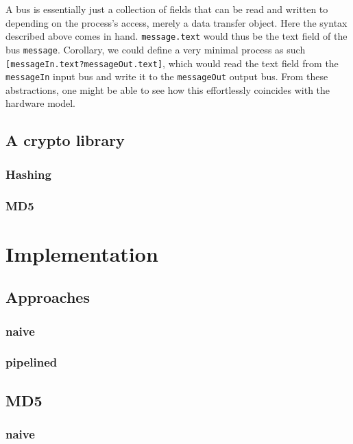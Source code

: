 \documentclass[a4paper]{article}
\begin{document}
A bus is essentially just a collection of fields that can be read and written to depending on the process's access, merely a data transfer object. Here the syntax described above comes in hand. \texttt{message.text} would thus be the text field of the bus \texttt{message}. Corollary, we could define a very minimal process as such \texttt{[messageIn.text?messageOut.text]}, which would read the text field from the \texttt{messageIn} input bus and write it to the \texttt{messageOut} output bus. From these abstractions, one might be able to see how this effortlessly coincides with the hardware model.
\subsection{A crypto library}
\label{sec:org91f869f}

\subsubsection{Hashing}
\label{sec:org1b3aca9}

\subsubsection{MD5}
\label{sec:org952fd00}

\section{Implementation}
\label{sec:org6f71d42}

\subsection{Approaches}
\label{sec:orgb42831d}

\subsubsection{naive}
\label{sec:org5fb0dbf}

\subsubsection{pipelined}
\label{sec:org3b2f4bd}

\subsection{MD5}
\label{sec:orgf1b8b92}

\subsubsection{naive}
\label{sec:org092f1e5}
\end{document}

